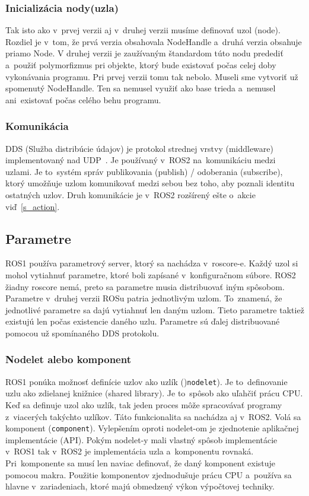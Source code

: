 \subsubsection{Inicializácia nody(uzla)}

	Tak isto ako v~prvej verzii aj v~druhej verzii musíme definovať uzol (node). Rozdiel je v~tom, že prvá verzia obsahovala NodeHandle a~druhá verzia obsahuje priamo Node.
	V druhej verzii je zaužívaným štandardom túto nodu predediť a~použiť polymorfizmus pri objekte, ktorý bude existovať počas celej doby vykonávania programu. Pri
	prvej verzii tomu tak nebolo. Museli sme vytvoriť už spomenutý NodeHandle. Ten sa nemusel využiť ako base trieda a~nemusel ani~existovať počas celého behu programu.

\subsubsection{Komunikácia}

	DDS (Služba distribúcie údajov) je protokol strednej vrstvy (middleware) implementovaný nad UDP~\cite{ROS2book}. Je používaný v~ROS2 na~komunikáciu
	medzi uzlami. Je to~systém správ publikovania (publish) / odoberania (subscribe), ktorý umožňuje uzlom komunikovať medzi sebou bez toho,
	aby poznali identitu ostatných uzlov. Druh komunikácie je v~ROS2 rozšírený ešte o~akcie viď~\ref{s_action}.

\subsection{Parametre}

	ROS1 používa parametrový server, ktorý sa nachádza v~roscore-e. Každý uzol si mohol vytiahnuť parametre, ktoré boli zapísané v~konfiguračnom súbore.
	ROS2 žiadny roscore nemá, preto sa parametre musia distribuovať iným spôsobom. Parametre v~druhej verzii ROSu patria jednotlivým uzlom. To~znamená, že jednotlivé
	parametre sa dajú vytiahnuť len daným uzlom. Tieto parametre taktiež existujú len počas existencie daného uzlu. Parametre sú ďalej distribuované pomocou už spomínaného
	DDS protokolu.

\subsubsection{Nodelet alebo komponent}

	ROS1 ponúka možnosť definície uzlov ako uzlík ()\texttt{nodelet}). Je to~definovanie uzlu ako zdielanej knižnice (shared library). Je to~spôsob ako uľahčiť
	prácu CPU. Keď sa definuje uzol ako uzlík, tak jeden proces môže spracovávať programy z~viacerých takýchto uzlíkov. Táto funkcionalita sa nachádza aj v~ROS2.
	Volá sa komponent (\texttt{component}). Vylepšením oproti nodelet-om je zjednotenie aplikačnej implementácie (API). Pokým nodelet-y mali vlastný spôsob
	implementácie v~ROS1 tak v~ROS2 je implementácia uzla a~komponentu rovnaká. Pri~komponente sa musí len naviac definovať, že daný komponent existuje pomocou makra.
	Použitie komponentov zjednodušuje prácu CPU a~používa sa hlavne v~zariadeniach, ktoré majú obmedzený výkon výpočtovej techniky.

